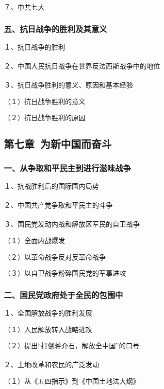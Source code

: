 \documentclass{ctexart}
\begin{document}
７、中共七大

\subsubsection{五、抗日战争的胜利及其意义}

１、抗日战争的胜利
\\\\

２、中国人民抗日战争在世界反法西斯战争中的地位
\\\\

３、抗日战争胜利的意义、原因和基本经验

（１）抗日战争胜利的意义

（２）抗日战争胜利的原因



\subsection{第七章\ 为新中国而奋斗}

\subsubsection{一、从争取和平民主到进行滋味战争}

１、抗战胜利后的国际国内局势
\\\\

２、中国共产党争取和平民主的斗争
\\\\

３、国民党发动内战和解放区军民的自卫战争

（１）全面内战爆发

（２）以革命战争反对反革命战争

（３）以自卫战争粉碎国民党的军事进攻

\subsubsection{二、国民党政府处于全民的包围中}

１、全国解放战争的胜利发展　

（１）人民解放转入战略进攻

（２）提出“打倒蒋介石，解放全中国”的口号
\\\\

２、土地改革和农民的广泛发动

（１）从《五四指示》到《中国土地法大纲》
\end{document}
